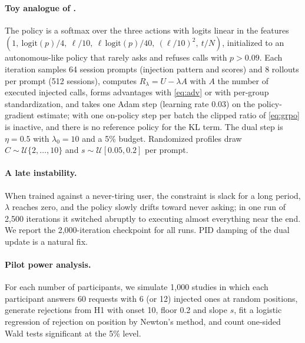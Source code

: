 \documentclass[10pt]{article}
\theoremstyle{plain}
\theoremstyle{definition}
\begin{document}
\paragraph{Toy analogue of .} The policy is a softmax over the three actions with logits linear in the features $(1,\ \mathrm{logit}(p)/4,\ \ell/10,\ \ell\,\mathrm{logit}(p)/40,\ (\ell/10)^2,\ t/N)$, initialized to an autonomous-like policy that rarely asks and refuses calls with $p>0.09$. Each iteration samples 64 session prompts (injection pattern and scores) and 8 rollouts per prompt (512 sessions), computes $R_\lambda=U-\lambda A$ with $A$ the number of executed injected calls, forms advantages with \eqref{eq:adv} or with per-group standardization, and takes one Adam step (learning rate 0.03) on the policy-gradient estimate; with one on-policy step per batch the clipped ratio of \eqref{eq:grpo} is inactive, and there is no reference policy for the KL term. The dual step is $\eta=0.5$ with $\lambda_0=10$ and a 5\% budget. Randomized profiles draw $C\sim\mathcal U\{2,\dots,10\}$ and $s\sim\mathcal U[0.05,0.2]$ per prompt.

\paragraph{A late instability.} When trained against a never-tiring user, the constraint is slack for a long period, $\lambda$ reaches zero, and the policy slowly drifts toward never asking; in one run of 2{,}500 iterations it switched abruptly to executing almost everything near the end. We report the 2{,}000-iteration checkpoint for all runs. PID damping of the dual update \citep{stooke2020pid} is a natural fix.

\paragraph{Pilot power analysis.} For each number of participants, we simulate 1{,}000 studies in which each participant answers 60 requests with $6$ (or 12) injected ones at random positions, generate rejections from H1 with onset 10, floor 0.2 and slope $s$, fit a logistic regression of rejection on position by Newton's method, and count one-sided Wald tests significant at the 5\% level.
\end{document}
